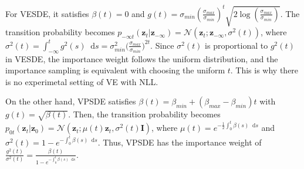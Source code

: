\documentclass{article}
\theoremstyle{definition}
\theoremstyle{remark}
\newcommand*\diff{\mathop{}\!\mathrm{d}}
\begin{document}
	For VESDE, it satisfies $\beta(t)=0$ and $g(t)=\sigma_{min}(\frac{\sigma_{max}}{\sigma_{min}})^{t}\sqrt{2\log{(\frac{\sigma_{max}}{\sigma_{min}})}}$. The transition probability becomes $p_{-\infty t}(\mathbf{z}_{t}\vert\mathbf{z}_{-\infty})=\mathcal{N}(\mathbf{z}_{t};\mathbf{z}_{-\infty},\sigma^{2}(t))$, where $\sigma^{2}(t)=\int_{-\infty}^{t}g^{2}(s)\diff s=\sigma_{min}^{2}\big(\frac{\sigma_{max}}{\sigma_{min}}\big)^{2t}$. Since $\sigma^{2}(t)$ is proportional to $g^{2}(t)$ in VESDE, the importance weight follows the uniform distribution, and the importance sampling is equivalent with choosing the uniform $t$. This is why there is no experimetal setting of VE with NLL.
	
	On the other hand, VPSDE satisfies $\beta(t)=\beta_{min}+(\beta_{max}-\beta_{min})t$ with $g(t)=\sqrt{\beta(t)}$. Then, the transition probability becomes $p_{0t}(\mathbf{z}_{t}\vert\mathbf{z}_{0})=\mathcal{N}(\mathbf{z}_{t};\mu(t)\mathbf{z}_{t},\sigma^{2}(t)\mathbf{I})$, where $\mu(t)=e^{-\frac{1}{2}\int_{0}^{t}\beta(s)\diff s}$ and $\sigma^{2}(t)=1-e^{-\int_{0}^{t}\beta(s)\diff s}$. Thus, VPSDE has the importance weight of $\frac{g^{2}(t)}{\sigma^{2}(t)}=\frac{\beta(t)}{1-e^{-\int_{0}^{t}\beta(s)\diff s}}$.
	
\end{document}
